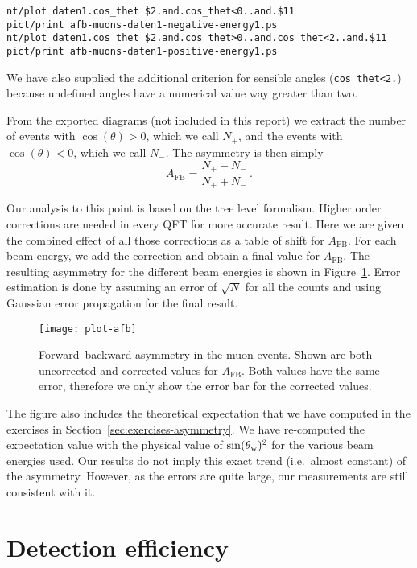\documentclass[11pt, english, fleqn, DIV=15, headinclude, BCOR=2cm]{scrreprt}
\begin{document}
\begin{lstlisting}
nt/plot daten1.cos_thet $2.and.cos_thet<0..and.$11
pict/print afb-muons-daten1-negative-energy1.ps
nt/plot daten1.cos_thet $2.and.cos_thet>0..and.cos_thet<2..and.$11
pict/print afb-muons-daten1-positive-energy1.ps
\end{lstlisting}

We have also supplied the additional criterion for sensible angles
(\texttt{cos\_thet<2.}) because undefined angles have a numerical value way
greater than two.

From the exported diagrams (not included in this report) we extract the number
of events with $\cos(\theta) > 0$, which we call $N_+$, and the events with
$\cos(\theta) < 0$, which we call $N_-$. The asymmetry is then simply
\[
    A_\text{FB} = \frac{N_+ - N_-}{N_+ + N_-} \,.
\]

Our analysis to this point is based on the tree level formalism. Higher order
corrections are needed in every QFT for more accurate result. Here we are given
the combined effect of all those corrections as a table of shift for
$A_\text{FB}$. For each beam energy, we add the correction and obtain a final
value for $A_\text{FB}$. The resulting asymmetry for the different beam
energies is shown in Figure~\ref{fig:plot-afb}. Error estimation is done by
assuming an error of $\sqrt{N}$ for all the counts and using Gaussian error
propagation for the final result.

\begin{figure}
    \centering
    \texttt{[image: plot-afb]}
    \caption{%
        Forward--backward asymmetry in the muon events. Shown are both
        uncorrected and corrected values for $A_\text{FB}$. Both values have
        the same error, therefore we only show the error bar for the corrected
        values.
    }
    \label{fig:plot-afb}
\end{figure}

The figure also includes the theoretical expectation that we have computed in
the exercises in Section~\ref{sec:exercises-asymmetry}. We have re-computed the
expectation value with the physical value of $\sin(\theta_\text w)^2$ for the
various beam energies used. Our results do not imply this exact trend (i.e.\
almost constant) of the asymmetry. However, as the errors are quite large, our
measurements are still consistent with it.

\section{Detection efficiency}
\label{sec:detection-efficiency}
\end{document}
